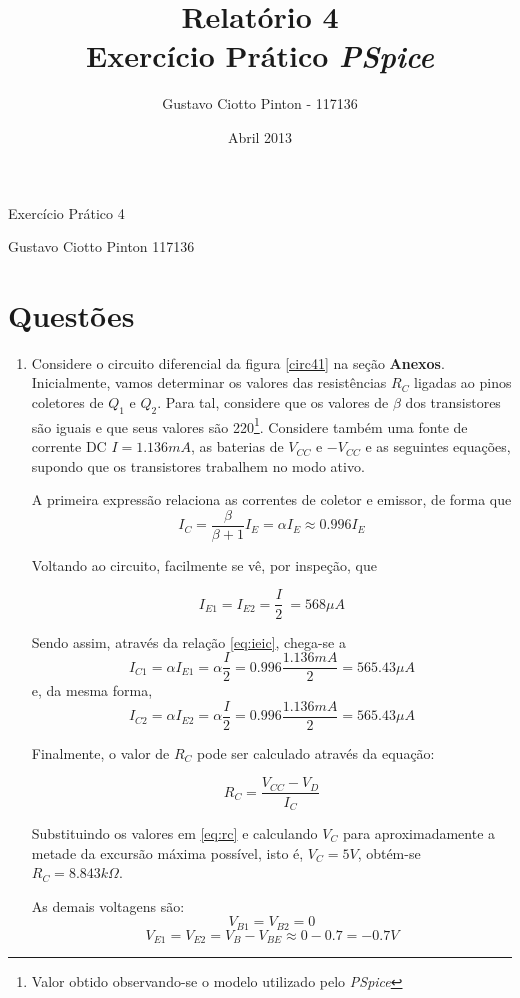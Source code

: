 \documentclass[12pt, a4paper]{article}
\title{Relatório 4\\Exercício Prático \textit{PSpice}}
\author{Gustavo Ciotto Pinton - 117136}
\date{Abril 2013}
\begin{document}
    {\large
    \centerline{Exercício Prático 4}
    \centerline{Gustavo Ciotto Pinton 117136}
    }
    \section*{Questões}
    
    \begin{enumerate}
    
    
        \item Considere o circuito diferencial da figura \ref{circ41} na seção \textbf{Anexos}. Inicialmente, vamos determinar os valores das resistências \(R_C\) ligadas ao pinos coletores de \(Q_1\) e \(Q_2\). Para tal, considere que os valores de \(\beta\) dos transistores são iguais e que seus valores são 220\footnote{Valor obtido observando-se o modelo utilizado pelo \textit{PSpice}}. Considere também uma fonte de corrente DC \(I=1.136mA\), as baterias de \(V_{CC}\) e \(-V_{CC}\) e as seguintes equações, supondo que os transistores trabalhem no modo ativo.
        
        A primeira expressão relaciona as correntes de coletor e emissor, de forma que        
        \begin{equation} \label{eq:ieic}
        I_C = \frac{\beta}{\beta+1} I_E = \alpha I_E \approx 0.996 I_E
        \end{equation}
                
        Voltando ao circuito, facilmente se vê, por inspeção, que 
        
        \[I_{E1} = I_{E2} = \frac{I}{2}\ = 568 \mu A \]
        
        Sendo assim, através da relação \ref{eq:ieic}, chega-se a \[I_{C1} = \alpha I_{E1} = \alpha \frac{I}{2} = 0.996 \frac{1.136mA}{2} = 565.43 \mu A\] e, da mesma forma, \[I_{C2} = \alpha I_{E2} = \alpha \frac{I}{2} = 0.996 \frac{1.136mA}{2} = 565.43 \mu A \]
        
        Finalmente, o valor de \(R_C\) pode ser calculado através da equação:
        
        \begin{equation} \label{eq:rc}
        R_C = \frac{V_{CC}-V_D}{I_C}
        \end{equation}
        
        Substituindo os valores em \ref{eq:rc} e calculando \(V_C\) para aproximadamente a metade da excursão máxima possível, isto é, \(V_C = 5V\), obtém-se \(R_C=8.843k \Omega \). 

        As demais voltagens são:
        \[V_{B1} = V_{B2} = 0\]
        \[V_{E1} = V_{E2} = V_B - V_{BE} \approx 0 - 0.7 = -0.7V\]


\end{enumerate}
\end{document}
